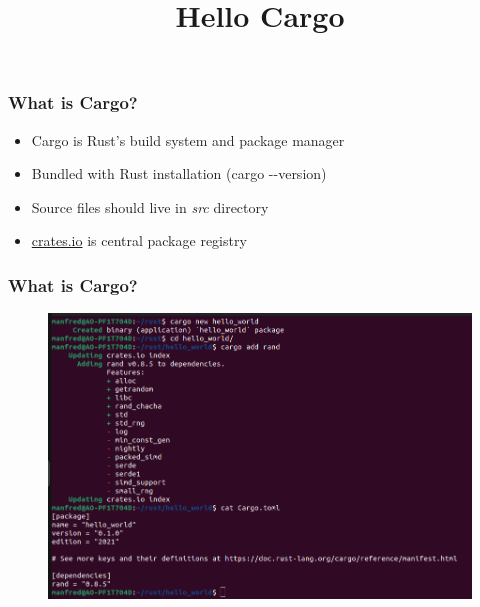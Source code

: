 \documentclass{beamer}
\title{Hello Cargo}
\begin{document}
\begin{frame}

\end{frame}


\begin{frame}
		\frametitle{What is Cargo?}
		\begin{itemize}
			\item Cargo is Rust's build system and package manager
            \vspace{\baselineskip}
			\item Bundled with Rust installation (cargo -{}-version)
            \vspace{\baselineskip}
			\item Source files should live in \textit{src} directory
            \vspace{\baselineskip}
			\item \href{https://crates.io}{crates.io} is central package registry
		\end{itemize}
\end{frame}

\begin{frame}
	\frametitle{What is Cargo?}
    \begin{figure}
        \centering
        \includegraphics[width=0.9\linewidth]{images/cargo-toml}
    \end{figure}
\end{frame}
\end{document}
